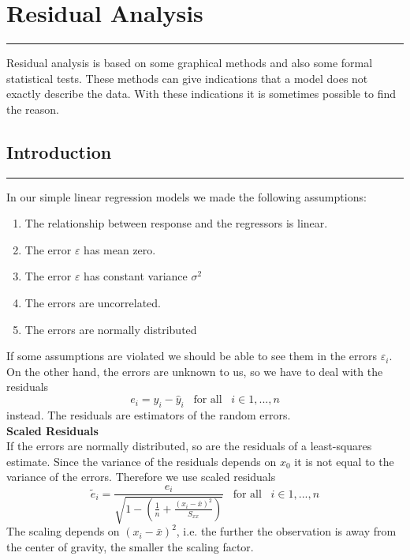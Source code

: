 \section{Residual Analysis}
\noindent\rule[\linienAbstand]{\linewidth}{\linienDickeDick}
Residual analysis is based on some graphical methods and also some formal statistical tests.
These methods can give indications that a model does not exactly describe the data.
With these indications it is sometimes possible to find the reason.

\subsection{Introduction}
\noindent\rule[\linienAbstand]{\linewidth}{\linienDicke}
In our simple linear regression models we made the following assumptions:
\begin{enumerate}
  \item The relationship between response and the regressors is linear.
  \item The error $\varepsilon$ has mean zero.
  \item The error $\varepsilon$ has constant variance $\sigma^2$
  \item The errors are uncorrelated.
  \item The errors are normally distributed
\end{enumerate}
If some assumptions are violated we should be able to see them in the errors $\varepsilon_i$. On the other hand, the errors are unknown to us, so we have to deal with the residuals
\begin{equation}
  e_i = y_i - \hat{y}_i \;\;\;\text{for all}\;\;\; i \in {1,...,n}
\end{equation}
instead. The residuals are estimators of the random errors.\\

\textbf{Scaled Residuals}\\
If the errors are normally distributed, so are the residuals of a least-squares estimate. Since the variance of the residuals depends on $x_0$ it is not equal to the variance of the errors. Therefore we use scaled residuals
\begin{equation}
  \tilde{e}_i = \frac{e_i}{\sqrt{1 - \left(\frac{1}{n} + \frac{(x_i - \bar{x})^2}{S_{xx}}\right)}} \;\;\;\text{for all}\;\;\; i \in {1,...,n}
\end{equation}
The scaling depends on $(x_i - \bar{x})^2$, i.e. the further the observation is away from the center of gravity, the smaller the scaling factor.

